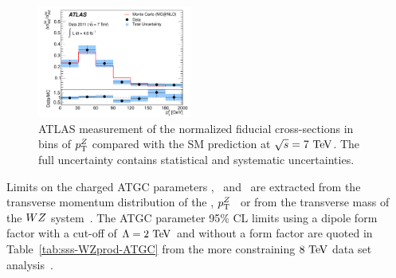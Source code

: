 \begin{figure}[htbp]
  \begin{center}
  \includegraphics[width=0.45\textwidth]{figures/sss-inclboson-diboson-wzprod-ptZ.pdf}
  \caption{ATLAS measurement of the normalized fiducial cross-sections in bins of $p_{\mathrm{T}}^Z$ compared with the SM prediction at $\rts = 7\TeV$. The full uncertainty contains statistical and systematic uncertainties.}
\label{fig:sss-WZprod-ptZ-det}
\end{center}
\end{figure}


Limits on the charged ATGC parameters \dkz, \lz\ and \gz\ are extracted from the transverse momentum distribution
of the \Zboson, $p_{\mathrm{T}}^Z$~\cite{Aad:2012twa} or from the transverse mass of the $WZ$ system~\cite{Aad:2016ett}. 
The ATGC parameter 95\% CL limits using a dipole form factor with a cut-off of $\Lambda=2\TeV$ and without a form factor are quoted 
in Table~\ref{tab:sss-WZprod-ATGC} from the more constraining $8\TeV$ data set analysis~\cite{Aad:2016ett}.



